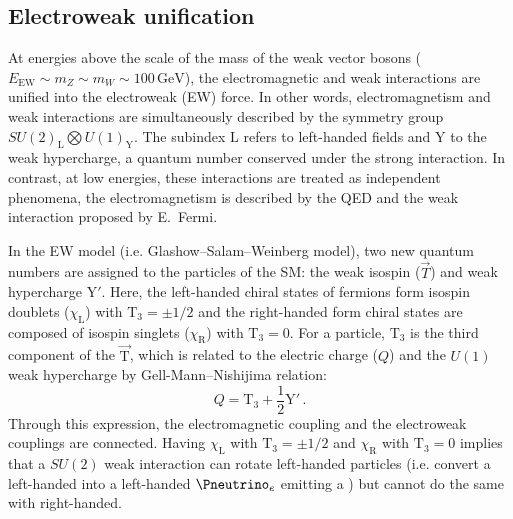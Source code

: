 


 


\subsection{Electroweak unification}
At energies above the scale of the mass of the weak vector bosons ($E_{\text{EW}} \sim m_{Z} \sim m_{W} \sim 100\,\textrm{GeV}$), the electromagnetic 
and weak interactions are unified into the electroweak (EW) force. In other words, electromagnetism and weak interactions are simultaneously described by the symmetry group $SU(2)_{\text{L}} \bigotimes U(1)_\text{Y}$. 
The subindex $\text{L}$ refers to left-handed fields and $\text{Y}$ to the weak hypercharge, a quantum number conserved under the strong interaction.  In contrast, at low energies, these interactions are treated as independent phenomena, 
the electromagnetism is described by the QED and the weak interaction proposed by E.~Fermi.

In the EW model (i.e. Glashow--Salam--Weinberg model), two new quantum numbers  are assigned to the particles of the SM: the weak isospin ($\overrightarrow{T}$) and weak hypercharge $\text{Y}'$.
Here, the left-handed chiral states of fermions form isospin doublets ($\chi_\text{L}$) with $\text{T}_{3} = \pm 1/2$ and the right-handed form chiral states are composed of isospin singlets ($\chi_\text{R}$)  with $\text{T}_{3} = 0$.
For a particle, $\text{T}_{3}$ is the third component of the $\overrightarrow{\text{T}}$, which is related to the electric charge ($Q$) and the $U(1)$ weak hypercharge by Gell-Mann--Nishijima relation:
\begin{equation}\label{eq:chap1:EW:GMN}
	Q = \text{T}_{3} + \frac{1}{2} \text{Y}' \, .
\end{equation}
%
Through this expression, the electromagnetic coupling and the electroweak couplings are connected.
Having $\chi_\text{L}$ with $\text{T}_{3} = \pm 1/2$ and $\chi_\text{R}$  with $\text{T}_{3} = 0$ implies that a $SU(2)$ weak interaction can rotate left-handed particles 
(i.e. convert a left-handed \Pelectron into a left-handed $\Pneutrino_{e}$ emitting a \PWminus) but cannot do the same with right-handed.

